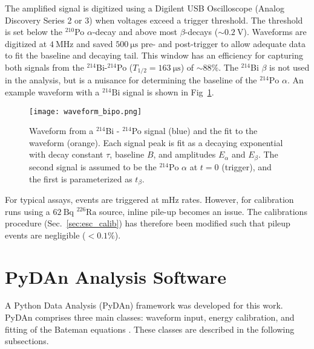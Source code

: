 \documentclass[final,3p,times]{elsarticle}
\begin{document}
The amplified signal is digitized using a Digilent USB Oscilloscope (Analog Discovery Series 2 or 3) when voltages exceed a trigger threshold. The threshold is set below the $^{210}$Po $\alpha$-decay and above most $\beta$-decays ($\sim 0.2~\mathrm{V}$).
Waveforms are digitized at $4~\text{MHz}$ and saved $500~\mathrm{\mu s}$  pre- and post-trigger to allow adequate data to fit the baseline and decaying tail. 
This window has an efficiency for capturing both signals from the $^{214}$Bi-$^{214}$Po ($T_{1/2}=163~\mathrm{\mu s}$) of $\sim 88\%$.
The $^{214}$Bi $\beta$ is not used in the analysis, but is a nuisance for determining the baseline of the $^{214}\text{Po}$ $\alpha$.
An example waveform with a $^{214}\text{Bi}$ signal is shown in Fig~\ref{fig:waveform_bi_po}.
\begin{figure}
\centering
  \texttt{[image: waveform\_bipo.png]}
  \caption{Waveform from a $^{214}$Bi - $^{214}$Po signal (blue) and the fit to the waveform (orange). Each signal peak is fit as a decaying exponential with decay constant $\tau$, baseline $B$, and amplitudes $E_\alpha$ and $E_\beta$. The second signal is assumed to be the $^{214}\mathrm{Po}$ $\alpha$ at $t=0$ (trigger), and the first is parameterized as $t_\beta$.}
  \label{fig:waveform_bi_po}
\end{figure}
For typical assays, events are triggered at mHz rates. However, for calibration runs using a $62~\text{Bq}$ $^{226}\text{Ra}$ source, inline pile-up becomes an issue. 
The calibrations procedure (Sec.~\ref{sec:esc_calib}) has therefore been modified such that pileup events are negligible ($< 0.1\%$).


\section{PyDAn Analysis Software}
\label{sec:PyDAn}
A Python Data Analysis (PyDAn) framework was developed for this work.
PyDAn comprises three main classes: waveform input, energy calibration, and fitting of the Bateman equations \cite{bateman1910}. 
These classes are described in the following subsections.
\end{document}
